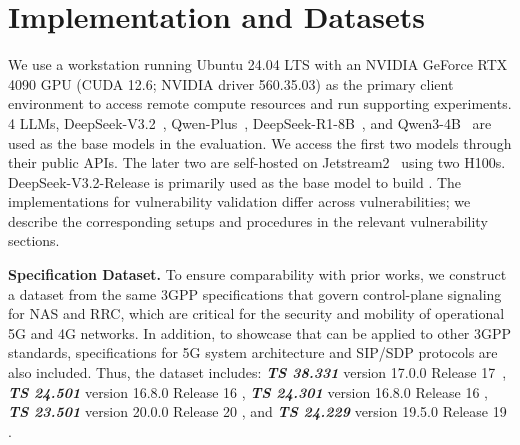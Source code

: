 \section{Implementation and Datasets} 
\label{append:implementation-datasets}
We use a workstation running Ubuntu 24.04 LTS with an NVIDIA GeForce RTX 4090 GPU (CUDA 12.6; NVIDIA driver 560.35.03) as the primary client environment to access remote compute resources and run supporting experiments. 4 LLMs, DeepSeek-V3.2~\cite{deepseek_v32_release_2025}, Qwen-Plus~\cite{qwen_plus_modelstudio_2026}, DeepSeek-R1-8B~\cite{deepseek_r1_distill_llama8b_2025}, and Qwen3-4B~\cite{qwen3_4b_instruct_2507} are used as the base models in the evaluation. We access the first two models through their public APIs. The later two are self-hosted on Jetstream2~\cite{jetstream2025llminference} using two H100s. DeepSeek-V3.2-Release is primarily used as the base model to build \core.  
The implementations for vulnerability validation differ across vulnerabilities; we describe the corresponding setups and procedures in the relevant vulnerability sections. 


\noindent \textbf{Specification Dataset.} To ensure comparability with prior works, we construct a dataset from the same 3GPP specifications that govern control-plane signaling for NAS and RRC, which are critical for the security and mobility of operational 5G and 4G networks. In addition, to showcase that \lm can be applied to other 3GPP standards, specifications for 5G system architecture and SIP/SDP protocols are also included.
Thus, the dataset includes: \textbf{\textit{TS 38.331}} version 17.0.0 Release 17~\cite{3GPP_TS_38331}, \textbf{\textit{TS 24.501}} version 16.8.0 Release 16 \cite{3GPP_TS_24501}, \textbf{\textit{TS 24.301}} version 16.8.0 Release 16 \cite{3GPP_TS_24301}, \textbf{\textit{TS 23.501}} version 20.0.0 Release 20 \cite{3GPP_TS_23501}, and \textbf{\textit{TS 24.229}} version 19.5.0 Release 19 \cite{ETSI-TS-124229}.  